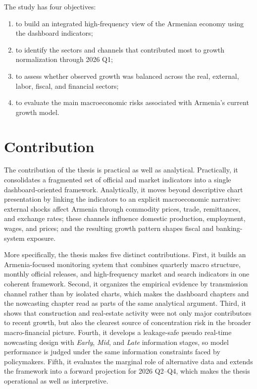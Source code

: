\documentclass[12pt,a4paper]{report}
\begin{document}
The study has four objectives:
\begin{enumerate}
    \item to build an integrated high-frequency view of the Armenian economy using the dashboard indicators;
    \item to identify the sectors and channels that contributed most to growth normalization through 2026 Q1;
    \item to assess whether observed growth was balanced across the real, external, labor, fiscal, and financial sectors;
    \item to evaluate the main macroeconomic risks associated with Armenia's current growth model.
\end{enumerate}

\section{Contribution}
The contribution of the thesis is practical as well as analytical. Practically, it consolidates a fragmented set of official and market indicators into a single dashboard-oriented framework. Analytically, it moves beyond descriptive chart presentation by linking the indicators to an explicit macroeconomic narrative: external shocks affect Armenia through commodity prices, trade, remittances, and exchange rates; these channels influence domestic production, employment, wages, and prices; and the resulting growth pattern shapes fiscal and banking-system exposure.

More specifically, the thesis makes five distinct contributions. First, it builds an Armenia-focused monitoring system that combines quarterly macro structure, monthly official releases, and high-frequency market and search indicators in one coherent framework. Second, it organizes the empirical evidence by transmission channel rather than by isolated charts, which makes the dashboard chapters and the nowcasting chapter read as parts of the same analytical argument. Third, it shows that construction and real-estate activity were not only major contributors to recent growth, but also the clearest source of concentration risk in the broader macro-financial picture. Fourth, it develops a leakage-safe pseudo real-time nowcasting design with \textit{Early}, \textit{Mid}, and \textit{Late} information stages, so model performance is judged under the same information constraints faced by policymakers. Fifth, it evaluates the marginal role of alternative data and extends the framework into a forward projection for 2026 Q2--Q4, which makes the thesis operational as well as interpretive.
\end{document}
